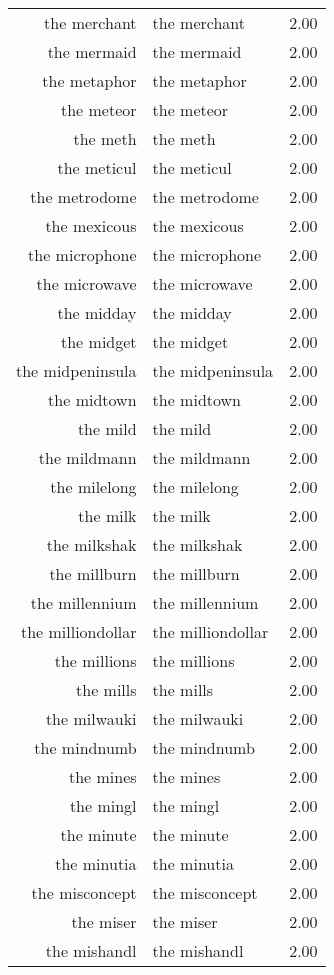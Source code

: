 \begin{table}[ht]
\begin{tabular}{rlr}
  the merchant & the merchant & 2.00 \\ 
  the mermaid & the mermaid & 2.00 \\ 
  the metaphor & the metaphor & 2.00 \\ 
  the meteor & the meteor & 2.00 \\ 
  the meth & the meth & 2.00 \\ 
  the meticul & the meticul & 2.00 \\ 
  the metrodome & the metrodome & 2.00 \\ 
  the mexicous & the mexicous & 2.00 \\ 
  the microphone & the microphone & 2.00 \\ 
  the microwave & the microwave & 2.00 \\ 
  the midday & the midday & 2.00 \\ 
  the midget & the midget & 2.00 \\ 
  the midpeninsula & the midpeninsula & 2.00 \\ 
  the midtown & the midtown & 2.00 \\ 
  the mild & the mild & 2.00 \\ 
  the mildmann & the mildmann & 2.00 \\ 
  the milelong & the milelong & 2.00 \\ 
  the milk & the milk & 2.00 \\ 
  the milkshak & the milkshak & 2.00 \\ 
  the millburn & the millburn & 2.00 \\ 
  the millennium & the millennium & 2.00 \\ 
  the milliondollar & the milliondollar & 2.00 \\ 
  the millions & the millions & 2.00 \\ 
  the mills & the mills & 2.00 \\ 
  the milwauki & the milwauki & 2.00 \\ 
  the mindnumb & the mindnumb & 2.00 \\ 
  the mines & the mines & 2.00 \\ 
  the mingl & the mingl & 2.00 \\ 
  the minute & the minute & 2.00 \\ 
  the minutia & the minutia & 2.00 \\ 
  the misconcept & the misconcept & 2.00 \\ 
  the miser & the miser & 2.00 \\ 
  the mishandl & the mishandl & 2.00 \\ 

\end{tabular}
\end{table}
